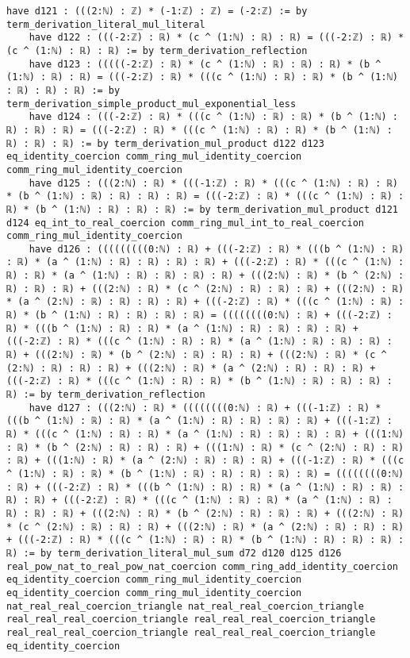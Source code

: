 \documentclass{article}
\begin{document}
\begin{tcolorbox}[colback=white!10, width=\linewidth]
\begin{lstlisting}[language=Lean4]
    have d121 : (((2:ℕ) : ℤ) * (-1:ℤ) : ℤ) = (-2:ℤ) := by term_derivation_literal_mul_literal
    have d122 : (((-2:ℤ) : ℝ) * (c ^ (1:ℕ) : ℝ) : ℝ) = (((-2:ℤ) : ℝ) * (c ^ (1:ℕ) : ℝ) : ℝ) := by term_derivation_reflection
    have d123 : (((((-2:ℤ) : ℝ) * (c ^ (1:ℕ) : ℝ) : ℝ) : ℝ) * (b ^ (1:ℕ) : ℝ) : ℝ) = (((-2:ℤ) : ℝ) * (((c ^ (1:ℕ) : ℝ) : ℝ) * (b ^ (1:ℕ) : ℝ) : ℝ) : ℝ) := by term_derivation_simple_product_mul_exponential_less
    have d124 : (((-2:ℤ) : ℝ) * (((c ^ (1:ℕ) : ℝ) : ℝ) * (b ^ (1:ℕ) : ℝ) : ℝ) : ℝ) = (((-2:ℤ) : ℝ) * (((c ^ (1:ℕ) : ℝ) : ℝ) * (b ^ (1:ℕ) : ℝ) : ℝ) : ℝ) := by term_derivation_mul_product d122 d123 eq_identity_coercion comm_ring_mul_identity_coercion comm_ring_mul_identity_coercion
    have d125 : (((2:ℕ) : ℝ) * (((-1:ℤ) : ℝ) * (((c ^ (1:ℕ) : ℝ) : ℝ) * (b ^ (1:ℕ) : ℝ) : ℝ) : ℝ) : ℝ) = (((-2:ℤ) : ℝ) * (((c ^ (1:ℕ) : ℝ) : ℝ) * (b ^ (1:ℕ) : ℝ) : ℝ) : ℝ) := by term_derivation_mul_product d121 d124 eq_int_to_real_coercion comm_ring_mul_int_to_real_coercion comm_ring_mul_identity_coercion
    have d126 : (((((((((0:ℕ) : ℝ) + (((-2:ℤ) : ℝ) * (((b ^ (1:ℕ) : ℝ) : ℝ) * (a ^ (1:ℕ) : ℝ) : ℝ) : ℝ) : ℝ) + (((-2:ℤ) : ℝ) * (((c ^ (1:ℕ) : ℝ) : ℝ) * (a ^ (1:ℕ) : ℝ) : ℝ) : ℝ) : ℝ) + (((2:ℕ) : ℝ) * (b ^ (2:ℕ) : ℝ) : ℝ) : ℝ) + (((2:ℕ) : ℝ) * (c ^ (2:ℕ) : ℝ) : ℝ) : ℝ) + (((2:ℕ) : ℝ) * (a ^ (2:ℕ) : ℝ) : ℝ) : ℝ) : ℝ) + (((-2:ℤ) : ℝ) * (((c ^ (1:ℕ) : ℝ) : ℝ) * (b ^ (1:ℕ) : ℝ) : ℝ) : ℝ) : ℝ) = ((((((((0:ℕ) : ℝ) + (((-2:ℤ) : ℝ) * (((b ^ (1:ℕ) : ℝ) : ℝ) * (a ^ (1:ℕ) : ℝ) : ℝ) : ℝ) : ℝ) + (((-2:ℤ) : ℝ) * (((c ^ (1:ℕ) : ℝ) : ℝ) * (a ^ (1:ℕ) : ℝ) : ℝ) : ℝ) : ℝ) + (((2:ℕ) : ℝ) * (b ^ (2:ℕ) : ℝ) : ℝ) : ℝ) + (((2:ℕ) : ℝ) * (c ^ (2:ℕ) : ℝ) : ℝ) : ℝ) + (((2:ℕ) : ℝ) * (a ^ (2:ℕ) : ℝ) : ℝ) : ℝ) + (((-2:ℤ) : ℝ) * (((c ^ (1:ℕ) : ℝ) : ℝ) * (b ^ (1:ℕ) : ℝ) : ℝ) : ℝ) : ℝ) := by term_derivation_reflection
    have d127 : (((2:ℕ) : ℝ) * ((((((((0:ℕ) : ℝ) + (((-1:ℤ) : ℝ) * (((b ^ (1:ℕ) : ℝ) : ℝ) * (a ^ (1:ℕ) : ℝ) : ℝ) : ℝ) : ℝ) + (((-1:ℤ) : ℝ) * (((c ^ (1:ℕ) : ℝ) : ℝ) * (a ^ (1:ℕ) : ℝ) : ℝ) : ℝ) : ℝ) + (((1:ℕ) : ℝ) * (b ^ (2:ℕ) : ℝ) : ℝ) : ℝ) + (((1:ℕ) : ℝ) * (c ^ (2:ℕ) : ℝ) : ℝ) : ℝ) + (((1:ℕ) : ℝ) * (a ^ (2:ℕ) : ℝ) : ℝ) : ℝ) + (((-1:ℤ) : ℝ) * (((c ^ (1:ℕ) : ℝ) : ℝ) * (b ^ (1:ℕ) : ℝ) : ℝ) : ℝ) : ℝ) : ℝ) = ((((((((0:ℕ) : ℝ) + (((-2:ℤ) : ℝ) * (((b ^ (1:ℕ) : ℝ) : ℝ) * (a ^ (1:ℕ) : ℝ) : ℝ) : ℝ) : ℝ) + (((-2:ℤ) : ℝ) * (((c ^ (1:ℕ) : ℝ) : ℝ) * (a ^ (1:ℕ) : ℝ) : ℝ) : ℝ) : ℝ) + (((2:ℕ) : ℝ) * (b ^ (2:ℕ) : ℝ) : ℝ) : ℝ) + (((2:ℕ) : ℝ) * (c ^ (2:ℕ) : ℝ) : ℝ) : ℝ) + (((2:ℕ) : ℝ) * (a ^ (2:ℕ) : ℝ) : ℝ) : ℝ) + (((-2:ℤ) : ℝ) * (((c ^ (1:ℕ) : ℝ) : ℝ) * (b ^ (1:ℕ) : ℝ) : ℝ) : ℝ) : ℝ) := by term_derivation_literal_mul_sum d72 d120 d125 d126 real_pow_nat_to_real_pow_nat_coercion comm_ring_add_identity_coercion eq_identity_coercion comm_ring_mul_identity_coercion eq_identity_coercion comm_ring_mul_identity_coercion nat_real_real_coercion_triangle nat_real_real_coercion_triangle real_real_real_coercion_triangle real_real_real_coercion_triangle real_real_real_coercion_triangle real_real_real_coercion_triangle eq_identity_coercion

\end{lstlisting}
\end{tcolorbox}
\end{document}
